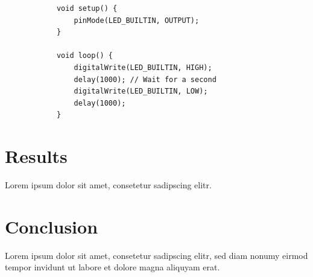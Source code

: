 \documentclass[a4paper,12pt]{article}
\makeatletter
\def\cleardoublepage{\clearpage\if@twoside \ifodd\c@page\else
	\hbox{}
	\thispagestyle{empty} %
	\newpage
	\if@twocolumn\hbox{}\newpage\fi\fi\fi}
\makeatother
\begin{document}
	\begin{listing}[H]
		\begin{verbatim}
			void setup() {
				pinMode(LED_BUILTIN, OUTPUT);
			}
			
			void loop() {
				digitalWrite(LED_BUILTIN, HIGH);
				delay(1000); // Wait for a second
				digitalWrite(LED_BUILTIN, LOW);
				delay(1000); 
			}
		\end{verbatim}
		\caption{Basic Blink sketch for Arduino}
		\label{lst:arduino_blink}
	\end{listing}
	
	\section{Results}
	\label{sec:results}
	Lorem ipsum dolor sit amet, consetetur sadipscing elitr.
	
	\section{Conclusion}
	\label{sec:conclusion}
	Lorem ipsum dolor sit amet, consetetur sadipscing elitr, sed diam nonumy eirmod tempor invidunt ut labore et dolore magna aliquyam erat.

	\cleardoublepage %
	
	
	 
	
\end{document}
